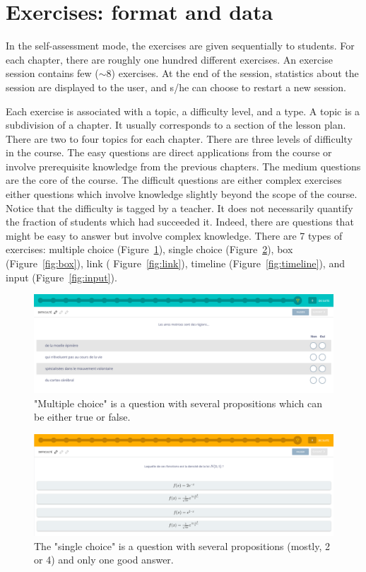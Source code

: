 \section{Exercises: format and data}
In the self-assessment mode, the exercises are given sequentially to students. For each chapter, there are roughly one hundred different exercises. An exercise session contains few ($\sim 8$) exercises. At the end of the session, statistics about the session are displayed to the user, and s/he can choose to restart a new session. 

Each exercise is associated with a topic, a difficulty level, and a type. A topic is a subdivision of a chapter. It usually corresponds to a section of the lesson plan. There are two to four topics for each chapter. There are three levels of difficulty in the course. The easy questions are direct applications from the course or involve prerequisite knowledge from the previous chapters. The medium questions are the core of the course. The difficult questions are either complex exercises either questions which involve knowledge slightly beyond the scope of the course. Notice that the difficulty is tagged by a teacher. It does not necessarily quantify the fraction of students which had succeeded it. Indeed, there are questions that might be easy to answer but involve complex knowledge. There are 7 types of exercises: multiple choice (Figure~\ref{fig:qcm}), single choice (Figure~\ref{fig:qcu}), box (Figure~\ref{fig:box}), link ( Figure~\ref{fig:link}), timeline (Figure~\ref{fig:timeline}), and input (Figure~\ref{fig:input}).  

\begin{figure}[!ht]
\centering
\includegraphics[clip, width= \textwidth]{1literature/fig/qcm.png}
\caption{"Multiple choice" is a question with several propositions which can be either true or false. }
\label{fig:qcm}
\end{figure}

\begin{figure}[!ht]
\centering
\includegraphics[clip, width= \textwidth]{1literature/fig/qcu.png}
\caption{The "single choice" is a question with several propositions (mostly, 2 or 4) and only one good answer.}
\label{fig:qcu}
\end{figure}

